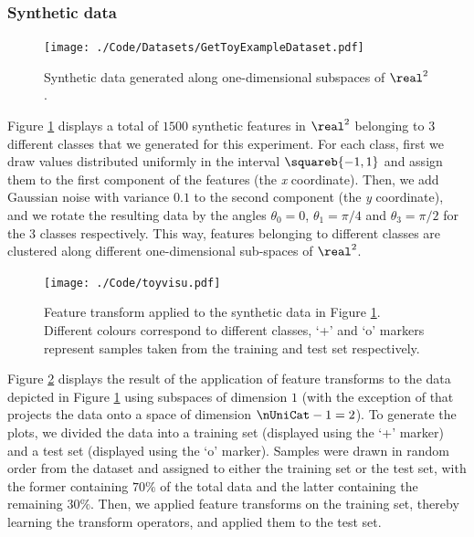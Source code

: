 \documentclass{article}
\begin{document}
\subsubsection{Synthetic data}
\begin{figure}
\centering
\texttt{[image: ./Code/Datasets/GetToyExampleDataset.pdf]}
\caption{\label{fig:toy}Synthetic data generated along one-dimensional subspaces of $\real^{2}$.}
\end{figure}
Figure \ref{fig:toy} displays a total of $1500$ synthetic features in $\real^{2}$ belonging to $3$ different classes that we generated for this experiment. For each class, first we draw values distributed uniformly in the interval $\squareb{-1,1}$ and assign them to the first component of the features (the \emph{x} coordinate). Then, we add Gaussian noise with variance $0.1$ to the second component (the \emph{y} coordinate), and we rotate the resulting data by the angles $\theta_{0}=0$, $\theta_{1}=\pi/4$ and $\theta_{3}=\pi/2$ for the $3$ classes respectively. This way, features belonging to different classes are clustered along different one-dimensional sub-spaces of $\real^{2}$.
\begin{figure}
\texttt{[image: ./Code/toyvisu.pdf]}
\caption{\label{fig:toyNewFea}Feature transform applied to the synthetic data in Figure \ref{fig:toy}. Different colours correspond to different classes, `+' and `o' markers represent samples taken from the training and test set respectively.}
\end{figure}

Figure \ref{fig:toyNewFea} displays the result of the application of feature transforms to the data depicted in Figure \ref{fig:toy} using subspaces of dimension $1$ (with the exception of  that projects the data onto a space of dimension $\nUniCat-1=2$). To generate the plots, we divided the data into a training set (displayed using the `+' marker) and a test set (displayed using the `o' marker). Samples were drawn in random order from the dataset and assigned to either the training set or the test set, with the former containing $70\%$ of the total data and the latter containing the remaining $30\%$. Then, we applied feature transforms on the training set, thereby learning the transform operators, and applied them to the test set. 
\end{document}
